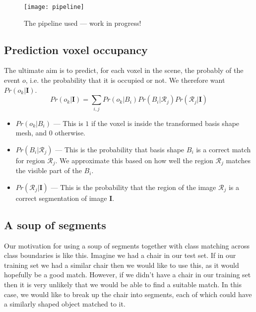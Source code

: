 \documentclass[10pt,a4paper]{article}
\makeatletter
\newcommand*{\ie}{i.e.\@\xspace}
\newcommand{\prob}{Pr}
\newcommand{\rgbdimage}{\mathbf{I}}
\newcommand{\imregion}{\mathcal{R}}
\newcommand{\occ}{o}
\newcommand{\basisshape}{B}
\makeatother
\begin{document}
\begin{figure}
	\centering 
	\texttt{[image: pipeline]}
	\caption{The pipeline used --- work in progress!}
	\label{fig:pipeline}
\end{figure}

\subsection{Prediction voxel occupancy}
The ultimate aim is to predict, for each voxel in the scene, the probably of the event $\occ$, \ie the probability that it is occupied or not. We therefore want $\prob(\occ_k | \rgbdimage)$.
$$
\prob(\occ_k | \rgbdimage) = \sum_{i,j} \prob(\occ_k|\basisshape_i)\prob(\basisshape_i|\imregion_j)\prob(\imregion_j|\rgbdimage)
$$

\begin{itemize}
\item $\prob(\occ_k|\basisshape_i)$ ---
This is $1$ if the voxel is inside the transformed basis shape mesh, and $0$ otherwise.
\item $\prob(\basisshape_i|\imregion_j)$ ---
This is the probability that basis shape $\basisshape_i$ is a correct match for region $\imregion_j$. We approximate this based on how well the region $\imregion_j$ matches the visible part of the $\basisshape_i$.
\item $\prob(\imregion_j|\rgbdimage)$ ---
This is the probability that the region of the image $\imregion_j$ is a correct segmentation of image $\rgbdimage$.
\end{itemize}


\subsection{A soup of segments}

Our motivation for using a soup of segments together with class matching across class boundaries is like this. 
Imagine we had a chair in our test set. If in our training set we had a similar chair then we would like to use this, as it would hopefully be a good match. 
However, if we didn't have a chair in our training set then it is very unlikely that we would be able to find a suitable match. 
In this case, we would like to break up the chair into segments, each of which could have a similarly shaped object matched to it.

\end{document}

